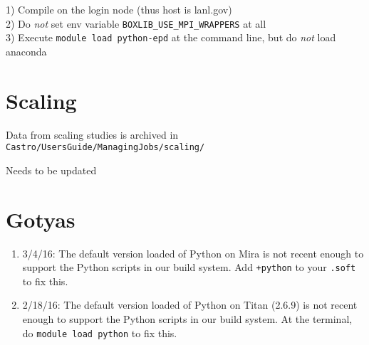 1) Compile on the login node (thus host is lanl.gov)\\
2) Do \textit{not} set env variable \texttt{BOXLIB\_USE\_MPI\_WRAPPERS} at all\\
3) Execute \texttt{module load python-epd} at the command line, but do \textit{not} load anaconda\\


\section{Scaling}

Data from scaling studies is archived in {\tt Castro/UsersGuide/ManagingJobs/scaling/}

Needs to be updated



\section{Gotyas}

\begin{enumerate}

\item 3/4/16: The default version loaded of Python on Mira is not
  recent enough to support the Python scripts in our build system. Add
  {\tt +python} to your {\tt .soft} to fix this.

\item 2/18/16: The default version loaded of Python on Titan (2.6.9)
  is not recent enough to support the Python scripts in our build
  system. At the terminal, do {\tt module load python} to fix this.


\end{enumerate}

